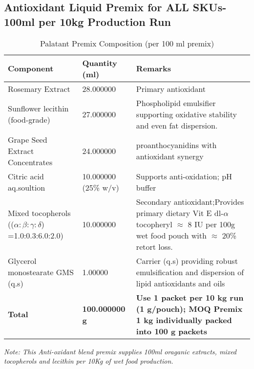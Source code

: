 \subsection*{Antioxidant Liquid Premix for ALL SKUs- 100ml per 10kg Production Run}
\begin{table}[h]
\centering
\caption{Palatant Premix Composition (per 100 ml premix)}
\label{tab:palatant}
\begin{tabular}{@{}lll@{}}
\toprule
\textbf{Component} & \textbf{Quantity (ml)} & \textbf{Remarks} \\
\midrule

Rosemary Extract & 28.000000 & Primary antioxidant \\ [3pt]
Sunflower lecithin (food-grade) & 27.000000 & Phospholipid emulsifier supporting oxidative stability and even fat dispersion. \\[3pt]
Grape Seed Extract Concentrates & 24.000000 & proanthocyanidins with antioxidant synergy  \\[2pt]
Citric acid aq.soultion & 10.000000 (25\% w/v) & Supports anti-oxidation; pH buffer \\[2pt]
Mixed tocopherols (($\alpha:\beta:\gamma:\delta$) =1.0:0.3:6.0:2.0) & 10.000000 & Secondary antioxidant;Provides primary dietary Vit E dl-$\alpha$ tocopheryl $\approx$ 8 IU per 100g wet food pouch with $\approx$ 20\% retort loss. \\[3pt]
Glycerol monostearate GMS (q.s) & 1.00000 & Carrier (q.s) providing robust emulsification and dispersion of lipid antioxidants and oils \\[3pt]
\midrule
\textbf{Total} & \textbf{100.000000 g} & \textbf{Use 1 packet per 10 kg run (1 g/pouch); MOQ Premix 1 kg individually packed into 100 g packets} \\
\bottomrule
\end{tabular}
\end{table}
\noindent\textit{Note: This Anti-oxidant blend premix supplies 100ml oraganic extracts, mixed tocopherols and lecithin per 10Kg of wet food production.}
\vspace{0.5em}
